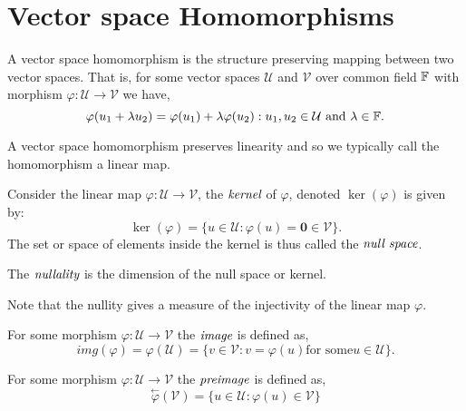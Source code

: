 
\section{Vector space Homomorphisms} %
\label{sec:linearmaps}

\begin{defn}
	A vector space homomorphism is the structure preserving mapping between two vector spaces.
	That is, for some vector spaces $\mathcal{U}$ and $\mathcal{V}$ over common field $\mathbb{F}$
	with morphism $\varphi : \mathcal{U} \to \mathcal{V}$ we have,
	\[
		\varphi(u_1 + \lambda u_2) = \varphi(u_1) + \lambda \varphi(u_2) : u_1,u_2 \in \mathcal{U} \text{ and } \lambda \in \mathbb{F}.
	\]
\end{defn}

\begin{rem}
	A vector space homomorphism preserves linearity and so we typically call the
	homomorphism a linear map.
\end{rem}

\begin{defn}[Kernel]
	Consider the linear map $\varphi : \mathcal{U} \to \mathcal{V}$, the
	$\emph{kernel}$ of $\varphi$, denoted $\ker(\varphi)$ is given by:
	\[
		\ker(\varphi) = \{ u \in \mathcal{U} : \varphi(u) = \mathbf{0} \in \mathcal{V} \}.
	\]
	The set or space of elements inside the kernel is thus called the $\emph{null space}$.
\end{defn}

\begin{defn}[Nullity]
	The $\emph{nullality}$ is the dimension of the null space or kernel.
\end{defn}

\begin{rem}
	Note that the nullity gives a measure of the injectivity of the linear map
	$\varphi$.
\end{rem}

\begin{defn}[Image]
	For some morphism $\varphi : \mathcal{U} \to \mathcal{V}$ the $\emph{image}$ is defined as,
	\[
		img(\varphi) =
		\varphi(\mathcal{U}) = \{ v \in \mathcal{V} : v = \varphi(u) \text{for some} u \in \mathcal{U} \}.
	\]
\end{defn}

\begin{defn}[Preimage]
	For some morphism $\varphi : \mathcal{U} \to \mathcal{V}$ the $\emph{preimage}$ is defined as,
	\[
		\stackrel{\leftarrow}{\varphi}(\mathcal{V}) = \{ u \in \mathcal{U} : \varphi(u) \in \mathcal{V} \}
	\]
\end{defn}


